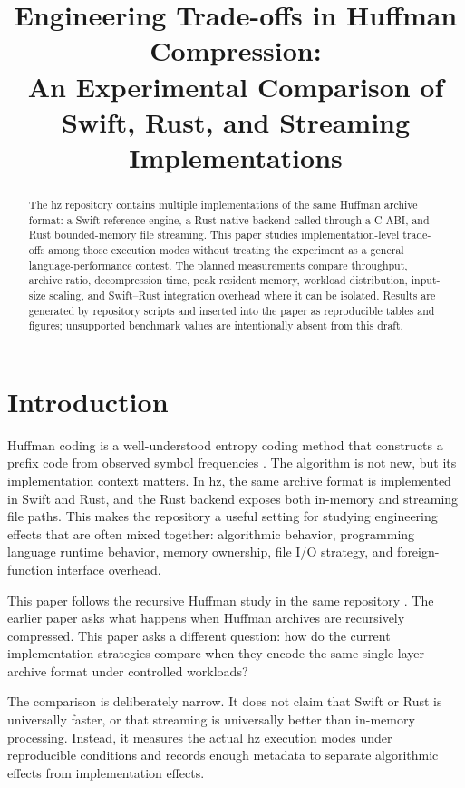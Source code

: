 \documentclass[conference]{IEEEtran}
\title{Engineering Trade-offs in Huffman Compression:\\
An Experimental Comparison of Swift, Rust, and Streaming Implementations}
\author{
\IEEEauthorblockN{Hz Project}
\IEEEauthorblockA{Reference Swift implementation and benchmark suite}
}
\begin{document}
\maketitle

\begin{abstract}
The hz repository contains multiple implementations of the same Huffman archive format: a Swift reference engine, a Rust native backend called through a C ABI, and Rust bounded-memory file streaming. This paper studies implementation-level trade-offs among those execution modes without treating the experiment as a general language-performance contest. The planned measurements compare throughput, archive ratio, decompression time, peak resident memory, workload distribution, input-size scaling, and Swift--Rust integration overhead where it can be isolated. Results are generated by repository scripts and inserted into the paper as reproducible tables and figures; unsupported benchmark values are intentionally absent from this draft.
\end{abstract}

\section{Introduction}

Huffman coding is a well-understood entropy coding method that constructs a prefix code from observed symbol frequencies \cite{huffman1952method,sayood2017introduction}. The algorithm is not new, but its implementation context matters. In hz, the same archive format is implemented in Swift and Rust, and the Rust backend exposes both in-memory and streaming file paths. This makes the repository a useful setting for studying engineering effects that are often mixed together: algorithmic behavior, programming language runtime behavior, memory ownership, file I/O strategy, and foreign-function interface overhead.

This paper follows the recursive Huffman study in the same repository \cite{hzRecursiveHuffman}. The earlier paper asks what happens when Huffman archives are recursively compressed. This paper asks a different question: how do the current implementation strategies compare when they encode the same single-layer archive format under controlled workloads?

The comparison is deliberately narrow. It does not claim that Swift or Rust is universally faster, or that streaming is universally better than in-memory processing. Instead, it measures the actual hz execution modes under reproducible conditions and records enough metadata to separate algorithmic effects from implementation effects.
\end{document}
